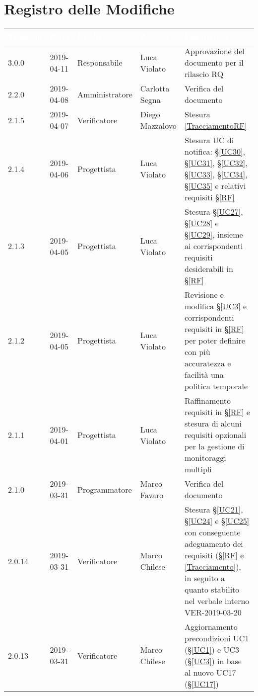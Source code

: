 \section*{Registro delle Modifiche}

\begin{center}
\begin{longtable}[C]{|m{}|m{}|m{}|m{}|p{}|}
\hline
\rowcolor{bluelogo}\textbf{\textcolor{white}{Versione}} & \textbf{\textcolor{white}{Data}} & \textbf{\textcolor{white}{Ruolo}} & \textbf{\textcolor{white}{Autore}} & \textbf{\textcolor{white}{Descrizione}} \\
\hline \hline
\endhead
3.0.0 & 2019-04-11 & Responsabile & Luca Violato & Approvazione del documento per il rilascio RQ\\
\hline
\rowcolor{grigio}2.2.0 & 2019-04-08 & Amministratore & Carlotta Segna & Verifica del documento \\
\hline
2.1.5 & 2019-04-07 & Verificatore & Diego Mazzalovo & Stesura \ref{TracciamentoRF}\\
\hline
\rowcolor{grigio}2.1.4 & 2019-04-06 & Progettista & Luca Violato & Stesura UC di notifica: §\ref{UC30}, §\ref{UC31}, §\ref{UC32}, §\ref{UC33}, §\ref{UC34}, §\ref{UC35} e relativi requisiti §\ref{RF}\\
\hline
2.1.3 & 2019-04-05 & Progettista & Luca Violato & Stesura §\ref{UC27}, §\ref{UC28} e §\ref{UC29}, insieme ai corrispondenti requisiti desiderabili in §\ref{RF}\\
\hline
\rowcolor{grigio}2.1.2 & 2019-04-05 & Progettista & Luca Violato & Revisione e modifica §\ref{UC3} e corrispondenti requisiti in §\ref{RF} per poter definire con più accuratezza e facilità una politica temporale\\
\hline
2.1.1 & 2019-04-01 & Progettista & Luca Violato & Raffinamento requisiti in §\ref{RF} e stesura di alcuni requisiti opzionali per la gestione di monitoraggi multipli\\
\hline
\rowcolor{grigio}2.1.0 & 2019-03-31 & Programmatore & Marco Favaro & Verifica del documento\\
\hline
2.0.14 & 2019-03-31 & Verificatore & Marco Chilese & Stesura §\ref{UC21}, §\ref{UC24} e §\ref{UC25} con conseguente adeguamento dei requisiti (§\ref{RF} e \ref{Tracciamento}), in seguito a quanto stabilito nel verbale interno VER-2019-03-20\\
\hline
\rowcolor{grigio}2.0.13 & 2019-03-31 & Verificatore & Marco Chilese & Aggiornamento precondizioni UC1 (§\ref{UC1}) e UC3 (§\ref{UC3}) in base al nuovo UC17 (§\ref{UC17})\\

\end{longtable}
\end{center}
